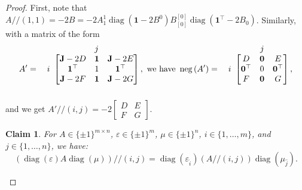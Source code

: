 \documentclass[10pt,a4paper]{amsart}
\newtheorem{claim}{Claim}
\newcommand{\F}{\mathbb{F}}
\DeclareMathOperator{\diag}{diag}
\DeclareMathOperator{\nega}{neg}
\newcommand{\trim}{/\!\!/}
\begin{document}
\begin{proof}
First, note that $A\trim(1,1) = -2B = -2A_1^1 \diag(\mathbf{1}-2B^0) B_{[0]}^{[0]}\diag(\mathbf{1}^\top-2B_0)$.
Similarly, with a matrix of the form
\begin{equation}\label{equation:nice_form}
A'=\begin{array}{c@{}c}
	& \begin{array}{ccc}
		& j & 
	\end{array}\\
	\begin{array}{c}
		\\i \\  \\
	\end{array} &\begin{bmatrix}
		\mathbf{J}-2D & \mathbf{1} & \mathbf{J}-2E\\
		\mathbf{1}^\top & 1 & \mathbf{1}^\top\\
		\mathbf{J}-2F & \mathbf{1} & \mathbf{J}-2G
	\end{bmatrix}\\&\end{array}\!\!, \text{ we have } \nega{(A')}=\begin{array}{c@{}c}
	& \begin{array}{ccc}
		& j & 
	\end{array}\\
	\begin{array}{c}
		\\i \\  \\
	\end{array} &\begin{bmatrix}
		D & \mathbf{0} & E\\
		\mathbf{0}^\top & 0 & \mathbf{0}^\top\\
		F & \mathbf{0} & G
	\end{bmatrix}\\&\end{array}\!\!,
	\end{equation}
	and we get $A'\trim(i,j) = -2\begin{bmatrix}
D&E\\F&G
\end{bmatrix}$.
\begin{claim}
For $A\in\{\pm1\}^{m\times n}$, $\varepsilon\in\{\pm1\}^m$, $\mu\in\{\pm1\}^n$, $i\in\{1,\ldots,m\}$, and $j\in\{1,\ldots,n\}$, we have:
\begin{equation}\label{equation:diag_trim_col}
	\left(\diag(\varepsilon)A\diag(\mu)\right)\trim(i,j) = \diag(\varepsilon_{\widehat{i}})(A\trim(i,j))\diag(\mu_{\widehat{j}}).
\end{equation}


\end{claim}
\end{proof}
\end{document}
